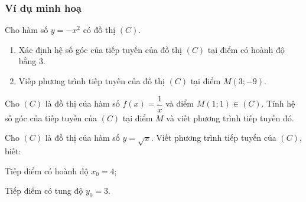 \begin{bt}
\subsubsection{Ví dụ minh hoạ}
\begin{vd}%
	Cho hàm số $y=-x^2$ có đồ thị $(C)$.
	\begin{enumerate}
	\item Xác định hệ số góc của tiếp tuyến của đồ thị $(C)$ tại điểm có hoành độ bằng $3$.
	\item Viếp phương trình tiếp tuyến của đồ thị $(C)$ tại điểm $M(3;-9)$.
	\end{enumerate}
\end{vd}
\begin{vd}%
	Cho $(C)$ là đồ thị của hàm số $f(x)=\dfrac{1}{x}$ và điểm $M(1; 1) \in(C)$. Tính hệ số góc của tiếp tuyến của $(C)$ tại điểm $M$ và viết phương trình tiếp tuyến đó.
\end{vd}
\begin{vd}%
	Cho $(C)$ là đồ thị của hàm số $y=\sqrt{x}$. Viết phương trình tiếp tuyến của $(C)$, biết:
	\begin{listEX}[2]
	\item Tiếp điểm có hoành độ $x_0=4$;
	\item Tiếp điểm có tung độ $y_0=3$.
	\end{listEX}	
\end{vd}
\end{bt}
